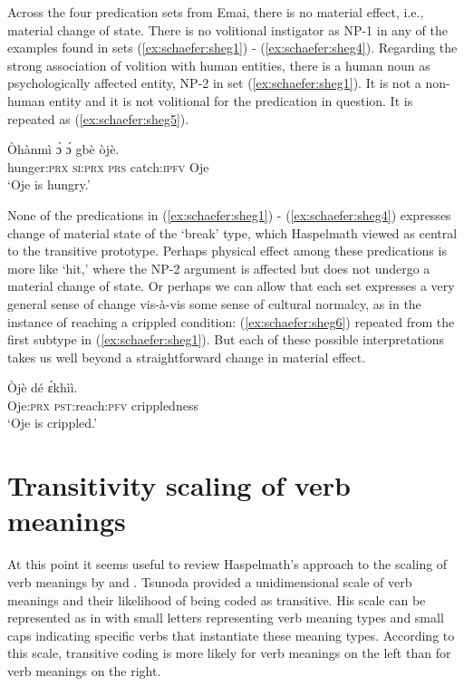 \documentclass[output=paper,colorlinks,citecolor=brown
]{langscibook}
\begin{document}
Across the four predication sets from Emai, there is no material effect, i.e., material change of state. There is no volitional instigator as NP-1 in any of the examples found in sets (\ref{ex:schaefer:sheg1}) - (\ref{ex:schaefer:sheg4}). Regarding the strong association of volition with human entities, there is a human noun as psychologically affected entity, NP-2 in set (\ref{ex:schaefer:sheg1}). It is not a non-human entity and it is not volitional for the predication in question. It is repeated as (\ref{ex:schaefer:sheg5}). 

 \ea \label{ex:schaefer:sheg5}
    \gll Òhànmì ɔ̀ ɔ́ gbè òjè. \\
            hunger:\textsc{prx} \textsc{si:prx} \textsc{prs} catch:\textsc{ipfv} Oje \\
           \glt  ‘Oje is hungry.’

\z	

None of the predications in (\ref{ex:schaefer:sheg1}) - (\ref{ex:schaefer:sheg4}) expresses change of material state of the ‘break’ type, which Haspelmath viewed as central to the transitive prototype. Perhaps physical effect among these predications is more like ‘hit,’ where the NP-2 argument is affected but does not undergo a material change of state. Or perhaps we can allow that each set expresses a very general sense of change vis-à-vis some sense of cultural normalcy, as in the instance of reaching a crippled condition: (\ref{ex:schaefer:sheg6}) repeated from the first subtype in (\ref{ex:schaefer:sheg1}). But each of these possible interpretations takes us well beyond a straightforward change in material effect.

 \ea \label{ex:schaefer:sheg6}
    \gll Òjè dé ɛ́khìì. \\
            Oje:\textsc{prx} \textsc{pst}:reach:\textsc{pfv} crippledness \\
           \glt  ‘Oje is crippled.’

\z	

\section{Transitivity scaling of verb meanings}

At this point it seems useful to review Haspelmath’s approach to the scaling of verb meanings by \citet{Tsunoda1985} and \citet{Malchukov2005}. Tsunoda provided a unidimensional scale of verb meanings and their likelihood of being coded as transitive. His scale can be represented as in  with small letters representing verb meaning types and small caps indicating specific verbs that instantiate these meaning types. According to this scale, transitive coding is more likely for verb meanings on the left than for verb meanings on the right.  
\end{document}
